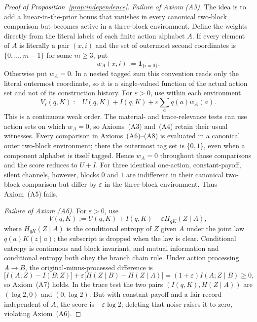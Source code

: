 \documentclass[11pt,a4paper]{article}
\theoremstyle{definition}
\newcommand{\I}{I}
\newcommand{\Sh}{H}
\newcommand{\1}{\mathbf 1}
\begin{document}
\begin{proof}[Proof of Proposition~\ref{prop:independence}]
\emph{Failure of Axiom \textup{(A5)}.}
The idea is to add a linear-in-the-prior bonus that vanishes in every canonical
two-block comparison but becomes active in a three-block environment.
Define the weights directly from the literal labels of each finite action alphabet $A$.  If every element of
$A$ is literally a pair $(x,i)$ and the set of outermost second coordinates is
$\{0,\ldots,m-1\}$ for some $m\ge3$, put
\[
 w_A(x,i):=\1_{\{i=0\}}.
\]
Otherwise put $w_A=0$.  In a nested tagged sum this convention reads only the literal outermost coordinate, so
it is a single-valued function of the actual action set and not of its construction history.  For
$\varepsilon>0$, use within each environment
\[
 V_\varepsilon(q,K):=U(q,K)+I(q,K)+\varepsilon\sum_aq(a)w_A(a).
\]
This is a continuous weak order.  The material- and trace-relevance tests can use action sets on which
$w_A=0$, so Axioms~\textup{(A3)} and~\textup{(A4)} retain their usual witnesses.
Every comparison in Axioms~\textup{(A6)--(A8)} is evaluated in a canonical outer two-block environment;
there the outermost tag set is $\{0,1\}$, even when a component alphabet is itself tagged.  Hence $w_A=0$
throughout those comparisons and the score reduces to $U+I$.  For three identical one-action,
constant-payoff, silent channels, however, blocks $0$ and $1$ are indifferent
in their canonical two-block comparison but differ by $\varepsilon$ in the
three-block environment.  Thus Axiom~\textup{(A5)} fails.

\emph{Failure of Axiom \textup{(A6)}.}
For $\varepsilon>0$, use
\begin{equation}
 V(q,K):=U(q,K)+I(q,K)-\varepsilon\Sh_{qK}(Z\mid A),
 \label{eq:no-record-dp}
\end{equation}
where $\Sh_{qK}(Z\mid A)$ is the conditional entropy of $Z$ given $A$ under the
joint law $q(a)K(z\mid a)$; the subscript is dropped when the law is clear.
Conditional entropy is continuous and block invariant, and mutual information
and conditional entropy both obey the branch chain rule.  Under action processing $A\to B$, the
original-minus-processed difference is
\[
 \bigl[\I(A;Z)-\I(B;Z)\bigr]
 +\varepsilon\bigl[\Sh(Z\mid B)-\Sh(Z\mid A)\bigr]
 =(1+\varepsilon)\I(A;Z\mid B)\ge0,
\]
so Axiom~\textup{(A7)} holds.  In the trace test the two pairs
$(I(q,K),\Sh(Z\mid A))$ are $(\log2,0)$ and $(0,\log2)$.  But with constant
payoff and a fair record independent of $A$, the score is
$-\varepsilon\log2$; deleting that noise raises it to zero, violating
Axiom~\textup{(A6)}.


\end{proof}
\end{document}
